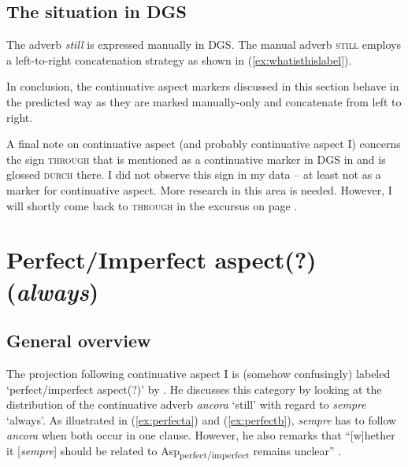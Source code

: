 \subsection{The situation in DGS}
The adverb \textit{still} is expressed manually in DGS. The manual adverb \textsc{still} employs a left-to-right concatenation strategy as shown in (\ref{ex:whatisthislabel}).

\begin{exe}
\ex\label{ex:whatisthislabel}\begin{xlist} 
\end{xlist}
\end{exe}




\noindent In conclusion, the continuative aspect markers discussed in this section behave in the predicted way as they are marked manually-only and concatenate from left to right.

A final note on continuative aspect (and probably continuative aspect I) concerns the sign \textsc{through} that is mentioned as a continuative marker in DGS in \citet[259]{rathmann2005event} and is glossed \textsc{durch} there. I did not observe this sign in my data -- at least not as a marker for continuative aspect. More research in this area is needed. However, I will shortly come back to \textsc{through} in the excursus on page \pageref{exkursfertigdurch}.




\section{Perfect/Imperfect aspect(?) (\textit{always})}
\subsection{General overview}
The projection following continuative aspect I is (somehow confusingly) labeled `perfect/imperfect aspect(?)' by \citet[96]{cinque1999adverbs}. He discusses this category by looking at the distribution of the continuative adverb \textit{ancora} `still' with regard to \textit{sempre} `always'. As illustrated in (\ref{ex:perfecta}) and (\ref{ex:perfectb}), \textit{sempre} has to follow \textit{ancora} when both occur in one clause. However, he also remarks that ``[w]hether it [\textit{sempre}] should be related to Asp\textsubscript{perfect/imperfect} remains unclear'' \citep[96]{cinque1999adverbs}. 

